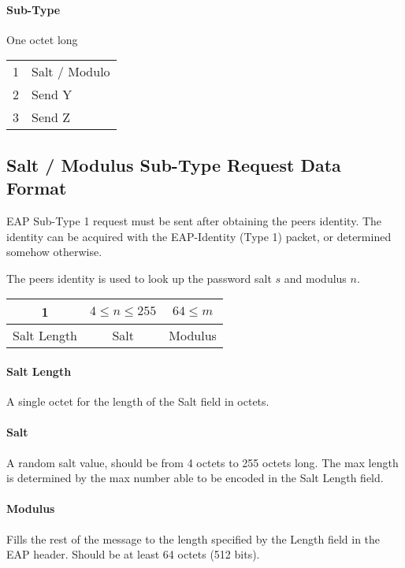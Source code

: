\paragraph{Sub-Type} One octet long

\bigskip 

\begin{tabular}{ll}
	1 & Salt / Modulo\\ %
	2 & Send Y \\
	3 & Send Z \\
\end{tabular}

\subsection{Salt / Modulus Sub-Type Request Data Format}

EAP Sub-Type 1 request must be sent after obtaining the peers identity. The identity can be acquired with the EAP-Identity (Type 1) packet, or determined somehow otherwise.

The peers identity is used to look up the password salt $s$ and modulus $n$.

\bigskip

\begin{center}
\begin{tabular}{|c|c|c|}
	\hline
	1 & $4 \le n \le 255 $ & $64 \le m$\\
	\hline
	Salt Length & Salt & Modulus\\
	\hline
\end{tabular}
\end{center}

\paragraph{Salt Length}
A single octet for the length of the Salt field in octets. %

\paragraph{Salt}
A random salt value, should be from 4 octets to 255 octets long.
The max length is determined by the max number able to be encoded in the Salt Length field.

\paragraph{Modulus}
Fills the rest of the message to the length specified by the Length field in the EAP header. %
Should be at least 64 octets (512 bits).

